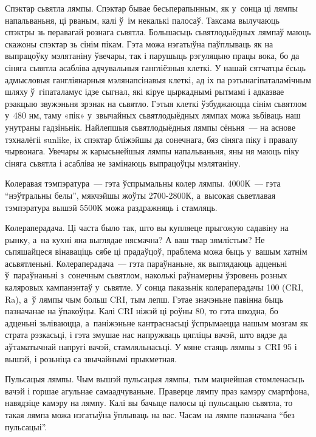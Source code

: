 Спэктар сьвятла лямпы. Спэктар бывае бесьперапынным, як у~сонца ці лямпы напальваньня, ці рваным, калі ў~ім некалькі палосаў. Таксама вылучаюць спэктры зь перавагай рознага сьвятла. Большасьць сьвятлодыёдных лямпаў маюць скажоны спэктар зь сінім пікам. Гэта можа нэгатыўна паўплываць як на выпрацоўку мэлятаніну ўвечары, так і парушыць рэгуляцыю працы вока, бо да сіняга сьвятла асабліва адчувальныя гангліёзныя клеткі. У нашай сятчатцы ёсьць адмысловыя гангліянарныя мэлянапсінавыя клеткі, ад іх па рэтынагіпаталамічным шляху ў~гіпаталамус ідзе сыгнал, які кіруе цыркаднымі рытмамі і адказвае рэакцыю звужэньня зрэнак на сьвятло. Гэтыя клеткі ўзбуджаюцца сінім сьвятлом у~480 нм, таму «пік» у~звычайных сьвятлодыёдных лямпах можа зьбіваць наш унутраны гадзіньнік. Найлепшыя сьвятлодыёдныя лямпы сёньня~--- на аснове тэхналёгіі sunlike, іх спэктар бліжэйшы да сонечнага, бяз сіняга піку і правалу чырвонага. Увечары ж карысьнейшыя лямпы напальваньня, яны ня маюць піку сіняга сьвятла і асабліва не замінаюць выпрацоўцы мэлятаніну.

Колеравая тэмпэратура~--- гэта ўспрымальны колер лямпы. 4000К~--- гэта ``нэўтральны белы'', мякчэйшы жоўты 2700-2800К, а~высокая сьветлавая тэмпэратура вышэй 5500К можа раздражняць і стамляць.

Колераперадача. Ці часта было так, што вы купляеце прыгожую садавіну на рынку, а~на кухні яна выглядае нясмачна? А ваш твар зямлістым? Не сьпяшайцеся вінаваціць сябе ці прадаўцоў, праблема можа быць у~вашым хатнім асьвятленьні. Колераперадача~--- гэта параўнаньне, як выглядаюць адценьні ў~параўнаньні з~сонечным сьвятлом, наколькі раўнамерны ўзровень розных каляровых кампанэнтаў у~сьвятле. У сонца паказьнік колераперадачы 100 (CRI, Ra), а~ў лямпы чым больш CRI, тым лепш. Гэтае значэньне павінна быць пазначанае на ўпакоўцы. Калі CRI ніжэй ці роўны 80, то гэта шкодна, бо адценьні зьліваюцца, а~паніжэньне кантраснасьці ўспрымаецца нашым мозгам як страта рэзкасьці, і гэта змушае нас напружваць цягліцы вачэй, што вядзе да аўтаматычнай напругі вачэй, стамляльнасьці. У мяне стаяць лямпы з~CRI 95 і вышэй, і розьніца са звычайнымі прыкметная.

Пульсацыя лямпы. Чым вышэй пульсацыя лямпы, тым мацнейшая стомленасьць вачэй і горшае агульнае самаадчуваньне. Праверце лямпу праз камэру смартфона, навядзіце камэру на лямпу. Калі вы бачыце палосы ці пульсацыю сьвятла, то такая лямпа можа нэгатыўна ўплываць на вас. Часам на лямпе пазначана ``без пульсацыі''.

